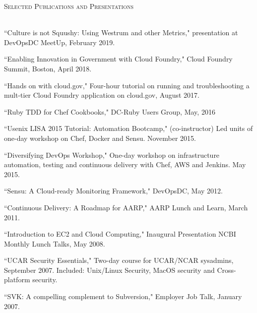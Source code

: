 \documentclass{article}
\newcommand{\lineunder}{\vspace*{-8pt} \\ \hspace*{-18pt} \hrulefill \\}
\newcommand{\header}[1]{{\hspace*{-15pt}\vspace*{6pt} \textsc{#1}} \vspace*{-6pt} \lineunder}
\newenvironment{achievements}{\begin{list}{\topsep 0pt \itemsep -2pt}} {\vspace*{4pt}\end{list}}
\begin{document}
\header{Selected Publications and Presentations}
\begin{achievements}
\item ``Culture is not Squushy: Using Westrum and other Metrics," presentation at DevOpsDC MeetUp, February 2019.
\item ``Enabling Innovation in Government with Cloud Foundry," Cloud Foundry Summit, Boston, April 2018.  
\item ``Hands on with cloud.gov," Four-hour tutorial on running and troubleshooting a mult-tier Cloud Foundry application on cloud.gov, August 2017.
\item ``Ruby TDD for Chef Cookbooks," DC-Ruby Users Group, May, 2016
\item ``Usenix LISA 2015 Tutorial: Automation Bootcamp," (co-instructor) Led units of one-day workshop on Chef, Docker and Sensu. November 2015.
\item ``Diversifying DevOps Workshop," One-day workshop on infrastructure automation, testing and continuous delivery with Chef, AWS and Jenkins. May 2015.
\item ``Sensu: A Cloud-ready Monitoring Framework," DevOpsDC, May 2012.
\item ``Continuous Delivery: A Roadmap for AARP," AARP Lunch and Learn, March 2011.
\item ``Introduction to EC2 and Cloud Computing," Inaugural Presentation NCBI Monthly Lunch Talks, May 2008.
\item ``UCAR Security Essentials,"  Two-day course for UCAR/NCAR sysadmins, September 2007. Included: Unix/Linux Security, MacOS security and Cross-platform security.
\item ``SVK: A compelling complement to Subversion," Employer Job Talk, January 2007.

\end{achievements}
\end{document}
